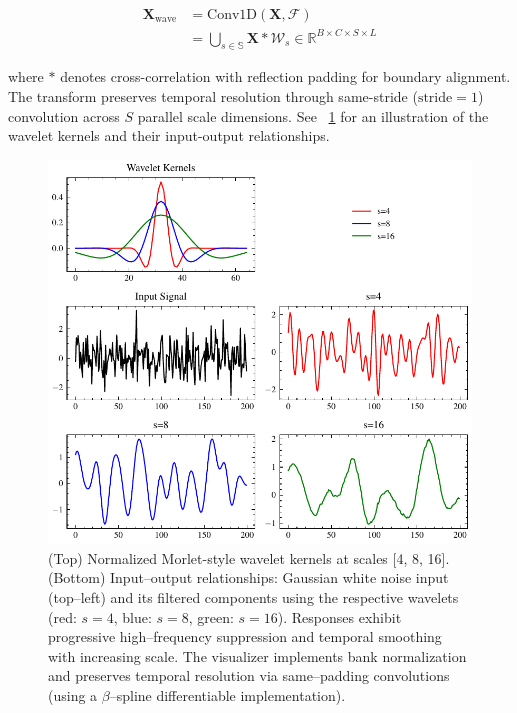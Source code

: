 \documentclass[10pt, conference]{IEEEtran}
\begin{document}
\begin{equation}
    \begin{aligned}
        \mathbf{X}_{\text{wave}} & = \text{Conv1D}(\mathbf{X}, \mathcal{F})                                                                 \\
                                 & = \bigcup_{s \in \mathbb{S}} \mathbf{X} \ast \mathcal{W}_s \in \mathbb{R}^{B \times C \times S \times L}
    \end{aligned}
\end{equation}

where $\ast$ denotes cross-correlation with reflection padding for boundary alignment. The transform preserves temporal resolution through same-stride ($\text{stride}=1$) convolution across $S$ parallel scale dimensions. See \figurename~\ref{fig:wavelet-transform} for an illustration of the wavelet kernels and their input-output relationships.


\begin{figure}[tb]
    \centering
    \includegraphics[width=\linewidth]{wavelet-transform.pdf}
    \caption{(Top) Normalized Morlet-style wavelet kernels at scales [4, 8, 16]. (Bottom) Input–output relationships: Gaussian white noise input (top–left) and its filtered components using the respective wavelets (red: $s=4$, blue: $s=8$, green: $s=16$). Responses exhibit progressive high–frequency suppression and temporal smoothing with increasing scale. The visualizer implements bank normalization and preserves temporal resolution via same–padding convolutions (using a $\beta$–spline differentiable implementation).}

    \label{fig:wavelet-transform}
\end{figure}
\end{document}
